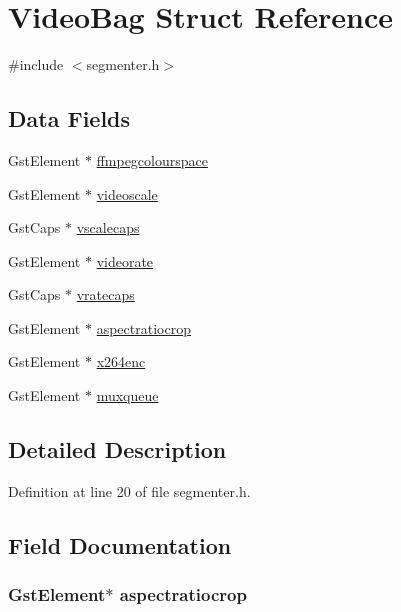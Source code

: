 \hypertarget{struct_video_bag}{\section{\-Video\-Bag \-Struct \-Reference}
\label{struct_video_bag}
}


{\ttfamily \#include $<$segmenter.\-h$>$}

\subsection*{\-Data \-Fields}
\begin{DoxyCompactItemize}
\item 
\-Gst\-Element $\ast$ \hyperlink{struct_video_bag_ae45b3f4ec98e5e429bf58f9ded85c0b4}{ffmpegcolourspace}
\item 
\-Gst\-Element $\ast$ \hyperlink{struct_video_bag_a87efc6ab0a3185089398de023439e26b}{videoscale}
\item 
\-Gst\-Caps $\ast$ \hyperlink{struct_video_bag_aa5f3820b0694a8f5358db66149ec7f10}{vscalecaps}
\item 
\-Gst\-Element $\ast$ \hyperlink{struct_video_bag_a14ada90c504b234ba99ef9a409d6a52f}{videorate}
\item 
\-Gst\-Caps $\ast$ \hyperlink{struct_video_bag_aa7a0309620904096b3d69456f926e19d}{vratecaps}
\item 
\-Gst\-Element $\ast$ \hyperlink{struct_video_bag_a6326c44e2f268ecff91f4198f0e0c60b}{aspectratiocrop}
\item 
\-Gst\-Element $\ast$ \hyperlink{struct_video_bag_a84465e4de5a0a5270d0b3d0f03e93f03}{x264enc}
\item 
\-Gst\-Element $\ast$ \hyperlink{struct_video_bag_a917a2aa09433aafbcda72454d53c196f}{muxqueue}
\end{DoxyCompactItemize}


\subsection{\-Detailed \-Description}


\-Definition at line 20 of file segmenter.\-h.



\subsection{\-Field \-Documentation}
\hypertarget{struct_video_bag_a6326c44e2f268ecff91f4198f0e0c60b}{
\subsubsection[{aspectratiocrop}]{\setlength{\rightskip}{0pt plus 5cm}\-Gst\-Element$\ast$ {\bf aspectratiocrop}}}\label{struct_video_bag_a6326c44e2f268ecff91f4198f0e0c60b}


